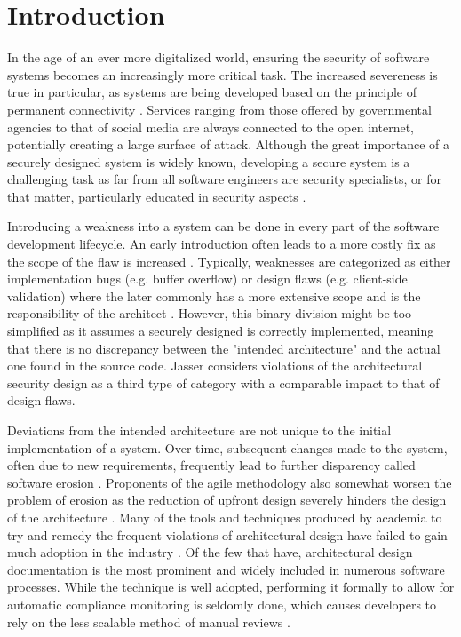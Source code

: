 \chapter{Introduction}
In the age of an ever more digitalized world, ensuring the security of software systems becomes an increasingly more critical task. The increased severeness is true in particular, as systems are being developed based on the principle of permanent connectivity \cite{felderer_security_2016}.  Services ranging from those offered by governmental agencies to that of social media are always connected to the open internet, potentially creating a large surface of attack. Although the great importance of a securely designed system is widely known, developing a secure system is a challenging task as far from all software engineers are security specialists, or for that matter, particularly educated in security aspects \cite{yoshioka_survey_2008}.

Introducing a weakness into a system can be done in every part of the software development lifecycle. An early introduction often leads to a more costly fix as the scope of the flaw is increased \cite{mcgraw_software_2004}. Typically, weaknesses are categorized as either implementation bugs (e.g. buffer overflow) or design flaws (e.g. client-side validation) where the later commonly has a more extensive scope and is the responsibility of the architect \cite{arce_avoiding_2014}. However, this binary division might be too simplified as it assumes a securely designed is correctly implemented, meaning that there is no discrepancy between the "intended architecture" and the actual one found in the source code. Jasser \cite{franch_constraining_2019} considers violations of the architectural security design as a third type of category with a comparable impact to that of design flaws.

Deviations from the intended architecture are not unique to the initial implementation of a system. Over time, subsequent changes made to the system, often due to new requirements, frequently lead to further disparency called software erosion \cite{de_silva_controlling_2012}. Proponents of the agile methodology also somewhat worsen the problem of erosion as the reduction of upfront design severely hinders the design of the architecture \cite{van_gurp_design_2002}. Many of the tools and techniques produced by academia to try and remedy the frequent violations of architectural design have failed to gain much adoption in the industry \cite{de_silva_controlling_2012}.  Of the few that have, architectural design documentation is the most prominent and widely included in numerous software processes. While the technique is well adopted, performing it formally to allow for automatic compliance monitoring is seldomly done, which causes developers to rely on the less scalable method of manual reviews \cite{de_silva_controlling_2012}.

